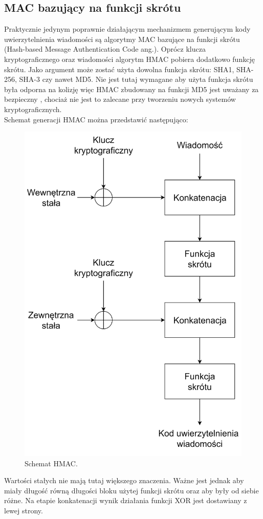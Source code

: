\subsection{MAC bazujący na funkcji skrótu}
Praktycznie jedynym poprawnie działającym mechanizmem generującym kody uwierzytelnienia wiadomości są algorytmy
MAC bazujące na funkcji skrótu (Hash-based Message Authentication Code ang.). 
Oprócz klucza kryptograficznego oraz wiadomości algorytm HMAC pobiera dodatkowo funkcję skrótu. 
Jako argument może zostać użyta dowolna funkcja skrótu: SHA1, SHA-256, SHA-3 czy nawet MD5. 
Nie jest tutaj wymagane aby użyta funkcja skrótu była odporna na kolizję więc HMAC zbudowany na
funkcji MD5 jest uważany za bezpieczny \cite{hmacmd5}, chociaż nie jest to zalecane przy tworzeniu nowych systemów kryptograficznych. \\
Schemat generacji HMAC można przedstawić następująco:
\begin{figure}[H]
    \centering
	\includegraphics[width=\textwidth, height=\textheight/2, keepaspectratio]{content/images/hmac}
    \caption{Schemat HMAC.}
\end{figure} 
\noindent
Wartości stałych nie mają tutaj większego znaczenia. Ważne jest jednak aby miały długość równą długości bloku
użytej funkcji skrótu oraz aby były od siebie różne. 
Na etapie konkatenacji wynik działania funkcji XOR jest dostawiany z lewej strony.

